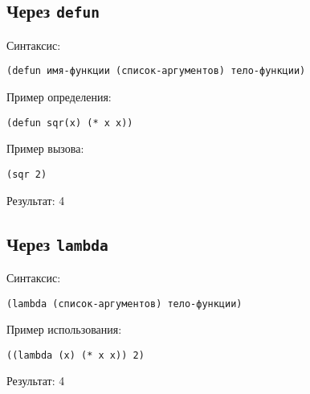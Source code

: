 \subsection{Через \texttt{defun}}

Синтаксис:
\begin{lstlisting}
(defun имя-функции (список-аргументов) тело-функции)
\end{lstlisting}

Пример определения:
\begin{lstlisting}
(defun sqr(x) (* x x))
\end{lstlisting}

Пример вызова:
\begin{lstlisting}
(sqr 2)
\end{lstlisting}
Результат: 4

\subsection{Через \texttt{lambda}}

Синтаксис:
\begin{lstlisting}
(lambda (список-аргументов) тело-функции)
\end{lstlisting}

Пример использования:
\begin{lstlisting}
((lambda (x) (* x x)) 2)
\end{lstlisting}
Результат: 4
